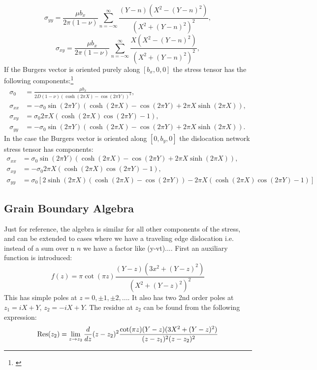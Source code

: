 \documentclass{article}
\begin{document}
\begin{equation}
\label{eq:edgexx}
\sigma_{yy} = \frac{\mu b_{x}}{2\pi(1-\nu)}\sum_{n=-\infty}^{\infty}\frac{(Y-n)(X^{2}-(Y-n)^{2})}{(X^{2}+(Y-n)^{2})^{2}},
\end{equation}
%
\begin{equation}
\label{eq:edgexx}
\sigma_{xy} = \frac{\mu b_{x}}{2\pi(1-\nu)}\sum_{n=-\infty}^{\infty}\frac{X(X^{2}-(Y-n)^{2})}{(X^{2}+(Y-n)^{2})^{2}},
\end{equation}
%
If the Burgers vector is oriented purely along $[b_{x},0,0]$ 
the stress tensor has the following components:\footnote{\cite{sutton95}}
%
\begin{align*}
\sigma_{0}  &= \frac{\mu b_{x}}{2D(1-\nu)(\cosh(2\pi X)-\cos(2\pi Y))^{2}},\\
\sigma_{xx} &= -\sigma_{0}\sin(2\pi Y)(\cosh(2\pi X) - \cos(2\pi Y)+2\pi X\sinh(2\pi X)),\\
\sigma_{xy} &= \sigma_{0}2\pi X(\cosh(2\pi X)\cos(2\pi Y)-1),\\
\sigma_{yy} &= -\sigma_{0}\sin(2\pi Y)(\cosh(2\pi X) - \cos(2\pi Y) + 2\pi X\sinh(2 \pi X)).
\end{align*}
%
In the case the Burgers vector is oriented along $[0,b_{y},0]$ the dislocation network
stress tensor has components:
\begin{align*}
\sigma_{xx} &= \sigma_{0}\sin(2\pi Y)(\cosh(2\pi X) - \cos(2\pi Y)+2\pi X\sinh(2\pi X)),\\
\sigma_{xy} &= -\sigma_{0}2\pi X(\cosh(2\pi X)\cos(2\pi Y)-1),\\
\sigma_{yy} &= \sigma_{0}\left[2\sinh(2\pi X)(\cosh(2\pi X)- \cos(2\pi Y)) - 2 \pi X(\cosh(2\pi X)\cos(2\pi Y)-1)\right]
\end{align*}

\subsection{Grain Boundary Algebra}
Just for reference, the algebra is similar for all other components of the stress, and
can be extended to cases where we have a traveling edge dislocation i.e. instead of
a sum over n $n$ we have a factor like (y-vt)....
First an auxiliary function is introduced:
%
\begin{equation}
f(z) =  \pi\cot(\pi z)\frac{(Y-z)(3x^{2} + (Y-z)^{2})}{(X^{2} + (Y-z)^{2})^{2}}
\end{equation}
%
This has simple poles at $z = 0, \pm 1, \pm 2,...$. It also has two 2nd 
order poles at  $z_{1}=iX+Y$, $z_{2}=-iX+Y$. The residue at $z_{2}$ can
be found from the following expression: 
%
\begin{equation}
{\rm Res}(z_{2}) = \lim_{z\rightarrow z_{2}}\frac{d}{dz}(z-z_{2})^{2}
\frac{\cot(\pi z)(Y-z)(3X^{2}+(Y-z)^2)}{(z-z_{1})^{2}(z-z_{2})^{2}}
\end{equation}
\end{document}
